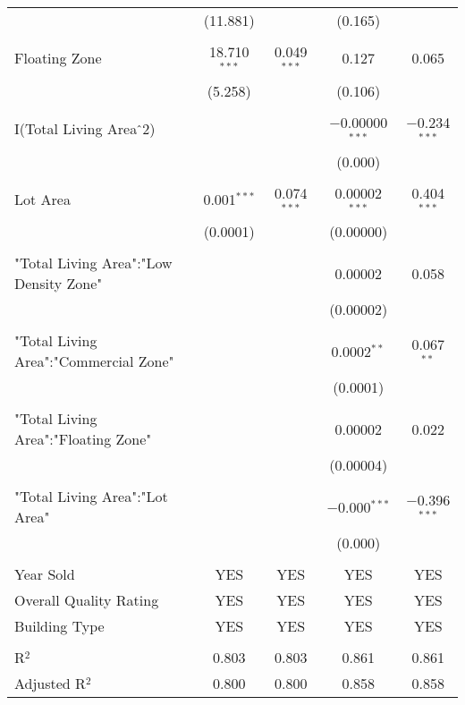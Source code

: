 \documentclass[a4paper]{article}
\begin{document}
\begin{table}[!htbp]
\begin{adjustwidth}{-0.0cm}{-0cm}
\begin{threeparttable}
\begin{tabular}{@{\extracolsep{-1pt}}lcccc}
  & (11.881) &  & (0.165) &  \\ 
  & & & & \\ 
 Floating Zone & 18.710$^{***}$ & 0.049$^{***}$ & 0.127 & 0.065 \\ 
  & (5.258) &  & (0.106) &  \\ 
  & & & & \\ 
 I(Total Living Area$\hat{\mkern6mu}$2) &  &  & $-$0.00000$^{***}$ & $-$0.234$^{***}$ \\ 
  &  &  & (0.000) &  \\ 
  & & & & \\ 
 Lot Area & 0.001$^{***}$ & 0.074$^{***}$ & 0.00002$^{***}$ & 0.404$^{***}$ \\ 
  & (0.0001) &  & (0.00000) &  \\ 
  & & & & \\ 
 "Total Living Area":"Low Density Zone" &  &  & 0.00002 & 0.058 \\ 
  &  &  & (0.00002) &  \\ 
  & & & & \\ 
 "Total Living Area":"Commercial Zone" &  &  & 0.0002$^{**}$ & 0.067$^{**}$ \\ 
  &  &  & (0.0001) &  \\ 
  & & & & \\ 
 "Total Living Area":"Floating Zone" &  &  & 0.00002 & 0.022 \\ 
  &  &  & (0.00004) &  \\ 
  & & & & \\ 
 "Total Living Area":"Lot Area" &  &  & $-$0.000$^{***}$ & $-$0.396$^{***}$ \\ 
  &  &  & (0.000) &  \\ 
  & & & & \\ 
  Year Sold & YES & YES & YES & YES \\ 
  Overall Quality Rating & YES & YES & YES & YES \\  
  Building Type & YES & YES & YES & YES \\ 
\hline \\[-1.8ex] 
R$^{2}$ & 0.803 & 0.803 & 0.861 & 0.861 \\ 
Adjusted R$^{2}$ & 0.800 & 0.800 & 0.858 & 0.858 \\ 

\end{tabular}
\end{threeparttable}
\end{adjustwidth}
\end{table}
\end{document}
